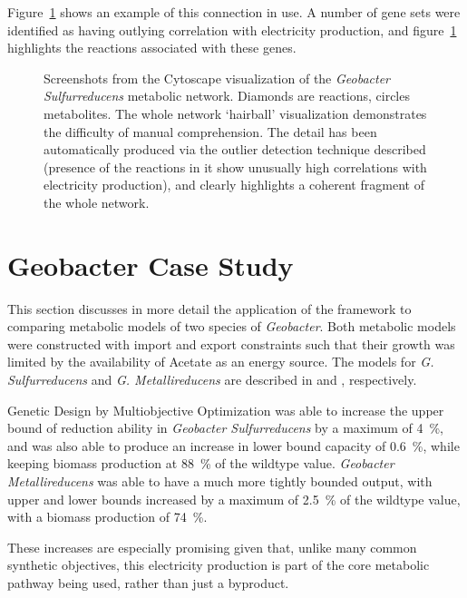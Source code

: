 \documentclass[a4paper,11pt]{article}
\begin{document}
Figure~\ref{fig:cytoscape-screenshot} shows an example of this connection in use. A number of gene sets were identified as having outlying correlation with electricity production, and figure~\ref{fig:cytoscape-screenshot} highlights the reactions associated with these genes. 

\begin{figure}[!htb]
\caption{Screenshots from the Cytoscape visualization of the {\it Geobacter Sulfurreducens} metabolic network. 
Diamonds are reactions, circles metabolites. 
The whole network `hairball' visualization demonstrates the difficulty of manual comprehension. 
The detail has been automatically produced via the outlier detection technique described (presence of the reactions in it show unusually high correlations with electricity production), and clearly highlights a coherent fragment of the whole network.}
\label{fig:cytoscape-screenshot}
\end{figure}

\section{Geobacter Case Study}
This section discusses in more detail the application of the framework to comparing metabolic models of two species of {\it Geobacter}. Both metabolic models were constructed with import and export constraints such that their growth was limited by the availability of Acetate as an energy source. The models for {\it G. Sulfurreducens} and {\it G. Metallireducens} are described in \cite{Mahadevan2006} and \cite{Sun2009}, respectively.

Genetic Design by Multiobjective Optimization was able to increase the upper bound of  reduction ability in {\it Geobacter Sulfurreducens} by a maximum of \SI{4}{\percent}, and was also able to produce an increase in lower bound capacity of  \SI{0.6}{\percent}, while keeping biomass production at  \SI{88}{\percent} of the wildtype value. 
{\it Geobacter Metallireducens} was able to have a much more tightly bounded output, with upper and lower bounds increased by a maximum of \SI{2.5}{\percent} of the wildtype value, with a biomass production of \SI{74}{\percent}.

These increases are especially promising given that, unlike many common synthetic objectives, this electricity production is part of the core metabolic pathway being used, rather than just a byproduct. 
\end{document}
